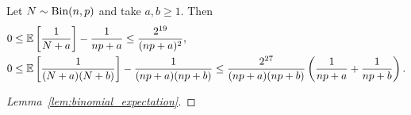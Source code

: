 \begin{lemma}%
  \label{lem:binomial_expectation}
  Let $N \sim \operatorname{Bin}(n, p)$ and take $a, b \geq 1$. Then
  \begin{align*}
    0
    &\leq
    \mathbb{E} \left[
      \frac{1}{N+a}
    \right]
    - \frac{1}{n p+a}
    \leq
    \frac{2^{19}}{(n p+a)^2}, \\
    0
    &\leq
    \mathbb{E} \left[
      \frac{1}{(N+a)(N+b)}
    \right]
    - \frac{1}{(n p+a)(n p+b)}
    \leq
    \frac{2^{27}}{(n p +a)(n p +b)}
    \left(
      \frac{1}{n p + a}
      + \frac{1}{n p + b}
    \right).
  \end{align*}

\end{lemma}

\begin{proof}[Lemma~\ref{lem:binomial_expectation}]


\end{proof}
